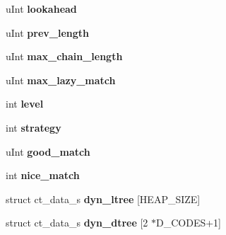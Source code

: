 \begin{DoxyCompactItemize}
\item 
\hypertarget{structdeflate__state_a511e4d2726696d5561aba9431bbec8da}{u\-Int {\bfseries lookahead}}\label{d3/df8/structdeflate__state_a511e4d2726696d5561aba9431bbec8da}

\item 
\hypertarget{structdeflate__state_a17a16a6444dcfdd6275e613f8c537fdf}{u\-Int {\bfseries prev\-\_\-length}}\label{d3/df8/structdeflate__state_a17a16a6444dcfdd6275e613f8c537fdf}

\item 
\hypertarget{structdeflate__state_ace56bdb4d4cc71767762927b0ffbbdcb}{u\-Int {\bfseries max\-\_\-chain\-\_\-length}}\label{d3/df8/structdeflate__state_ace56bdb4d4cc71767762927b0ffbbdcb}

\item 
\hypertarget{structdeflate__state_a50380b078a755d6a1916148530941c09}{u\-Int {\bfseries max\-\_\-lazy\-\_\-match}}\label{d3/df8/structdeflate__state_a50380b078a755d6a1916148530941c09}

\item 
\hypertarget{structdeflate__state_a2f59bbded27fa209545d20574cb8a8a4}{int {\bfseries level}}\label{d3/df8/structdeflate__state_a2f59bbded27fa209545d20574cb8a8a4}

\item 
\hypertarget{structdeflate__state_af9cfc1b261359497e5aa9eb2411566d7}{int {\bfseries strategy}}\label{d3/df8/structdeflate__state_af9cfc1b261359497e5aa9eb2411566d7}

\item 
\hypertarget{structdeflate__state_afeb7bf864ce6c2a14011a5ce3b0943d0}{u\-Int {\bfseries good\-\_\-match}}\label{d3/df8/structdeflate__state_afeb7bf864ce6c2a14011a5ce3b0943d0}

\item 
\hypertarget{structdeflate__state_adde533d70ce6aa72a01ecc3978008d84}{int {\bfseries nice\-\_\-match}}\label{d3/df8/structdeflate__state_adde533d70ce6aa72a01ecc3978008d84}

\item 
\hypertarget{structdeflate__state_a93043e7143ad9789fd1161d3b7b8881c}{struct ct\-\_\-data\-\_\-s {\bfseries dyn\-\_\-ltree} \mbox{[}H\-E\-A\-P\-\_\-\-S\-I\-Z\-E\mbox{]}}\label{d3/df8/structdeflate__state_a93043e7143ad9789fd1161d3b7b8881c}

\item 
\hypertarget{structdeflate__state_a1291e321b7e4c516895cece896a1087c}{struct ct\-\_\-data\-\_\-s {\bfseries dyn\-\_\-dtree} \mbox{[}2 $\ast$D\-\_\-\-C\-O\-D\-E\-S+1\mbox{]}}\label{d3/df8/structdeflate__state_a1291e321b7e4c516895cece896a1087c}


\end{DoxyCompactItemize}

